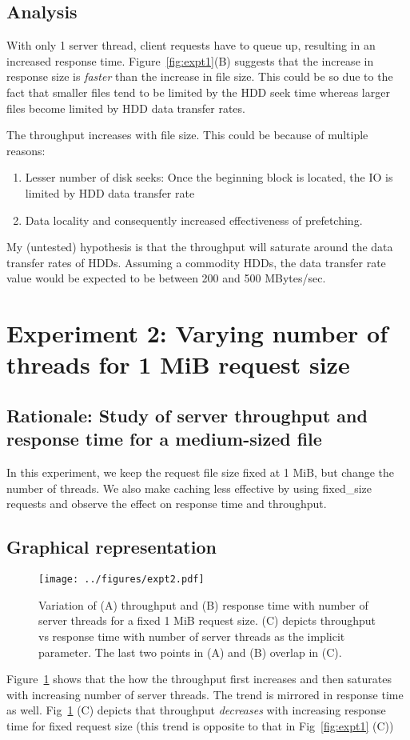 \documentclass[11pt,letterpaper]{article}
\begin{document}
\subsection{Analysis}
With only 1 server thread, client requests have to queue up, resulting in an increased response time. Figure~\ref{fig:expt1}(B) suggests that the increase in response size is {\em faster} than the increase in file size. This could be so due to the fact that smaller files tend to be limited by the HDD seek time whereas  larger files become limited by HDD data transfer rates. 

The throughput increases with file size. This could be because of multiple reasons: 
\begin{enumerate}
\item Lesser number of disk seeks: Once the beginning block is located, the IO is limited by HDD data transfer rate
\item  Data locality and consequently increased effectiveness of prefetching.
\end{enumerate}
My (untested) hypothesis is that the throughput will saturate around the data transfer rates of HDDs. Assuming a commodity HDDs, the data transfer rate value would be expected to be between 200 and 500 MBytes/sec. 
\section{Experiment 2: Varying number of threads for 1 MiB request size}
\subsection{Rationale: Study of server throughput and response time for a medium-sized file}
In this experiment, we keep the request file size fixed at 1 MiB, but change the number of threads. We also make caching less effective by  using {\sc fixed_size} requests and observe the effect on response time and throughput. 
\subsection{Graphical representation}
\begin{figure}[!tbp]
\centering
\texttt{[image: ../figures/expt2.pdf]}
\caption{Variation of (A) throughput and (B) response time with number of server threads for a fixed 1 MiB request size. (C) depicts throughput vs response time with number of server threads as the implicit parameter. The last two points in (A) and (B) overlap in (C).\label{fig:expt2}}
\end{figure}
Figure~\ref{fig:expt2} shows that the how the throughput first increases and then saturates with increasing number of server threads. The trend is mirrored in response time as well. Fig~\ref{fig:expt2} (C) depicts that throughput {\em decreases} with increasing response time for fixed request size (this trend is opposite to that in Fig~\ref{fig:expt1} (C))     
\end{document}
